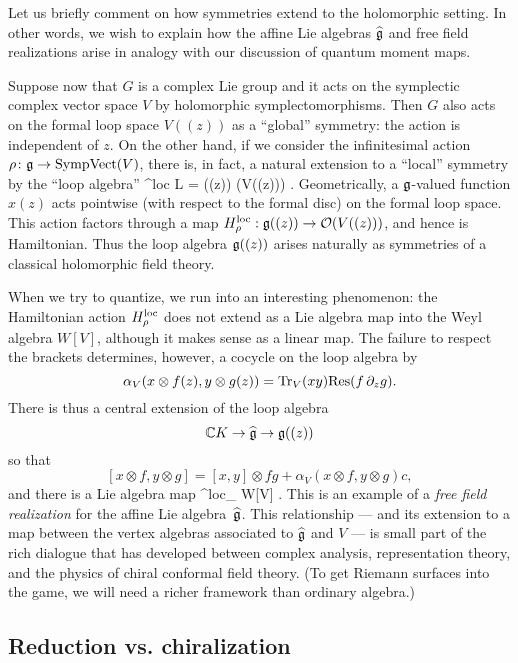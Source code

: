 \documentclass[11pt]{amsart}
\begin{document}
Let us briefly comment on how symmetries extend to the holomorphic setting.
In other words, we wish to explain how the affine Lie algebras $\widehat{\mathfrak g}$ and free field realizations arise in analogy with our discussion of quantum moment maps.

Suppose now that $G$ is a complex Lie group and it acts on the symplectic complex vector space $V$ by holomorphic symplectomorphisms.
Then $G$ also acts on the formal loop space $V((z))$ as a ``global'' symmetry:
the action is independent of $z$.
On the other hand, if we consider the infinitesimal action $\rho \colon \mathfrak g \to {\rm SympVect}(V)$,
there is, in fact, a natural extension to a ``local'' symmetry by the ``loop algebra'' 
\beqn
\rho^{\rm loc} \colon L \fg = \fg ((z)) (V((z))) .
\eeqn
Geometrically, a $\mathfrak g$-valued function $x(z)$ acts pointwise (with respect to the formal disc) on the formal loop space.
This action factors through a map $H_\rho^{\rm loc}: \mathfrak g((z)) \to \mathcal O(V((z)))$,
and hence is Hamiltonian.
Thus the loop algebra $\mathfrak g((z))$ arises naturally as symmetries of a classical holomorphic field theory.

When we try to quantize, we run into an interesting phenomenon:
the Hamiltonian action $H_\rho^{\rm loc}$ does not extend as a Lie algebra map into the Weyl algebra $W[V]$,
although it makes sense as a linear map.
The failure to respect the brackets determines, however, a cocycle on the loop algebra
by
\[
\alpha_V( x \otimes f(z) , y \otimes g(z)) = {\rm Tr}_V(xy) {\rm Res}(f \, \partial_z g).
\]
There is thus a central extension of the loop algebra 
\[
\mathbb C K\to \widehat{\mathfrak g} \to \mathfrak g((z))
\]
so that 
\[
[x \otimes f, y \otimes g] = [x,y] \otimes fg + \alpha_V( x \otimes f , y \otimes g) c,
\]
and there is a Lie algebra map
\beqn\label{eqn:freefield1}
^{\rm loc}_\rho \colon \widehat{\fg} \to W[V] .
\eeqn
This is an example of a {\em free field realization} for the affine Lie algebra~$\widehat{\mathfrak g}$.
This relationship --- and its extension to a map between the vertex algebras associated to $\widehat{\mathfrak g}$ and $V$ --- is small part of the rich dialogue that has developed between complex analysis, representation theory, and the physics of chiral conformal field theory.
(To get Riemann surfaces into the game, we will need a richer framework than ordinary algebra.)

\subsection{Reduction vs. chiralization}
\label{sec: red vs chiral}
\end{document}
